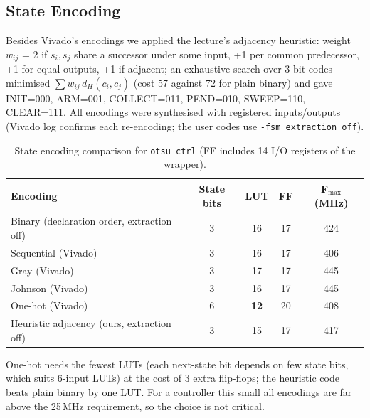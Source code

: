 \documentclass[11pt,a4paper]{article}
\begin{document}
\subsection{State Encoding}
Besides Vivado's encodings we applied the lecture's adjacency heuristic: weight $w_{ij}$ = 2 if $s_i,s_j$ share a successor under
some input, +1 per common predecessor, +1 for equal outputs, +1 if adjacent; an exhaustive search over 3-bit codes minimised
$\sum w_{ij}\,d_H(c_i,c_j)$ (cost 57 against 72 for plain binary) and gave INIT=000, ARM=001, COLLECT=011, PEND=010,
SWEEP=110, CLEAR=111. All encodings were synthesised with registered inputs/outputs (Vivado log confirms each re-encoding;
the user codes use \texttt{-fsm\_extraction off}).
\begin{table}[H]\centering\footnotesize
\caption{State encoding comparison for \texttt{otsu\_ctrl} (FF includes 14 I/O registers of the wrapper).}\label{tab:encoding}
\begin{tabular}{@{}lcccc@{}}
\toprule
Encoding & State bits & LUT & FF & F$_\text{max}$ (MHz)\\
\midrule
Binary (declaration order, extraction off) & 3 & 16 & 17 & 424\\
Sequential (Vivado) & 3 & 16 & 17 & 406\\
Gray (Vivado) & 3 & 17 & 17 & 445\\
Johnson (Vivado) & 3 & 16 & 17 & 445\\
One-hot (Vivado) & 6 & \textbf{12} & 20 & 408\\
Heuristic adjacency (ours, extraction off) & 3 & 15 & 17 & 417\\
\bottomrule
\end{tabular}
\end{table}
One-hot needs the fewest LUTs (each next-state bit depends on few state bits, which suits 6-input LUTs) at the cost of 3 extra
flip-flops; the heuristic code beats plain binary by one LUT. For a controller this small all encodings are far above the 25\,MHz
requirement, so the choice is not critical.
\end{document}
